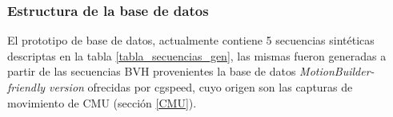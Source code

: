 \subsubsection{Estructura de la base de datos}

El prototipo de base de datos, actualmente contiene 5 secuencias sintéticas descriptas en la tabla \ref{tabla_secuencias_gen}, las mismas fueron generadas a partir de las secuencias BVH provenientes la 
base de datos \textit{MotionBuilder-friendly version} ofrecidas por cgspeed\cite{cgspeed}, cuyo origen son las capturas de movimiento de CMU (sección \ref{CMU}). 





